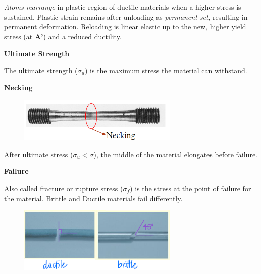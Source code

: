 \noindent \textit{Atoms rearrange} in plastic region of ductile materials when a higher stress is sustained. Plastic strain remains after unloading as \textit{permanent set}, resulting in permanent deformation. Reloading is linear elastic up to the new, higher yield stress (at \textbf{A'}) and a reduced ductility.

\vspace{3mm}
\noindent \textbf{Ultimate Strength}

\vspace{5pt}

\noindent The ultimate strength ($\sigma_u$) is the maximum stress the material can withstand.

\vspace{3mm}
\noindent \textbf{Necking}

\begin{figure}[!h]
\centering
\includegraphics[angle=0, width=3in]{Material Properties-Figures/Necking.png}
\vspace{-2mm}
\caption{\small {}}
\vspace{-3mm}
\label{Fig:Necking}
\end{figure}

\noindent After ultimate stress ($\sigma_u < \sigma$), the middle of the material elongates before failure.

\vspace{3mm}
\noindent \textbf{Failure}

\vspace{5pt}

\noindent Also called fracture or rupture stress ($\sigma_f$) is the stress at the point of failure for the material. Brittle and Ductile materials fail differently.

\begin{figure}[!h]
\centering
\includegraphics[angle=0, width=3in]{Material Properties-Figures/Ductile vs Brittle.png}
\vspace{-2mm}
\caption{\small {}}
\vspace{-3mm}
\label{Fig:DuctVsBrittle}
\end{figure}

